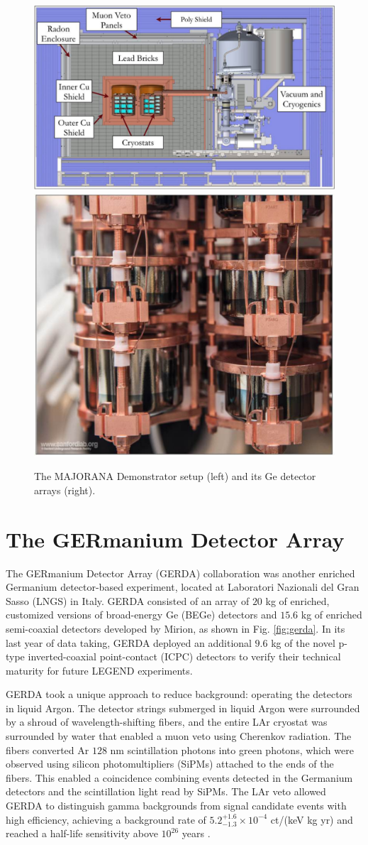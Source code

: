 \begin{figure}
  \centering
  \includegraphics[height=0.34\columnwidth]{ch2/figs/mjd_setup.pdf}
  \qquad
  \includegraphics[height=0.34\columnwidth]{ch2/figs/mjd_ppc_array.pdf}
  \caption{The MAJORANA Demonstrator setup (left) and its Ge detector arrays (right).}
    \label{fig:mjd}
  \end{figure}
 
\section{The GERmanium Detector Array}

The GERmanium Detector Array (GERDA) collaboration was another enriched Germanium detector-based experiment, located at Laboratori Nazionali del Gran Sasso (LNGS) in Italy. GERDA consisted of an array of $20$ kg of enriched, customized versions of broad-energy Ge (BEGe) detectors and $15.6$ kg of enriched semi-coaxial detectors developed by Mirion, as shown in Fig. \ref{fig:gerda}. In its last year of data taking, GERDA deployed an additional $9.6$ kg of the novel p-type inverted-coaxial point-contact (ICPC) detectors to verify their technical maturity for future LEGEND experiments.

GERDA took a unique approach to reduce background: operating the detectors in liquid Argon. The detector strings submerged in liquid Argon were surrounded by a shroud of wavelength-shifting fibers, and the entire LAr cryostat was surrounded by water that enabled a muon veto using Cherenkov radiation. The fibers converted Ar $128$ nm scintillation photons into green photons, which were observed using silicon photomultipliers (SiPMs) attached to the ends of the fibers. This enabled a coincidence combining events detected in the Germanium detectors and the scintillation light read by SiPMs. The LAr veto allowed GERDA to distinguish gamma backgrounds from {\onbb} signal candidate events with high efficiency, achieving a background rate of $5.2^{+1.6}_{-1.3}\times 10^{-4}$ ct/(keV kg yr) and reached a half-life sensitivity above $10^{26}$ years \cite{GERDA_final}.

